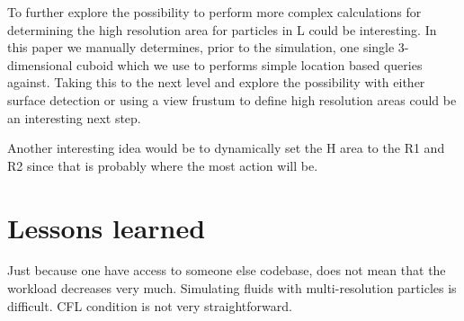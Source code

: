 \documentclass[../../main.tex]{subfiles}
\begin{document}
To further explore the possibility to perform more complex calculations for determining the high resolution area for particles in L could be interesting. In this paper we manually determines, prior to the simulation, one single 3-dimensional cuboid which we use to performs simple location based queries against. Taking this to the next level and explore the possibility with either surface detection or using a view frustum to define high resolution areas could be an interesting next step. 

Another interesting idea would be to dynamically set the H area to the R1 and R2 since that is probably where the most action will be.

\section{Lessons learned}
Just because one have access to someone else codebase, does not mean that the workload decreases very much. Simulating fluids with multi-resolution particles is difficult. CFL condition is not very straightforward. 
\end{document}
